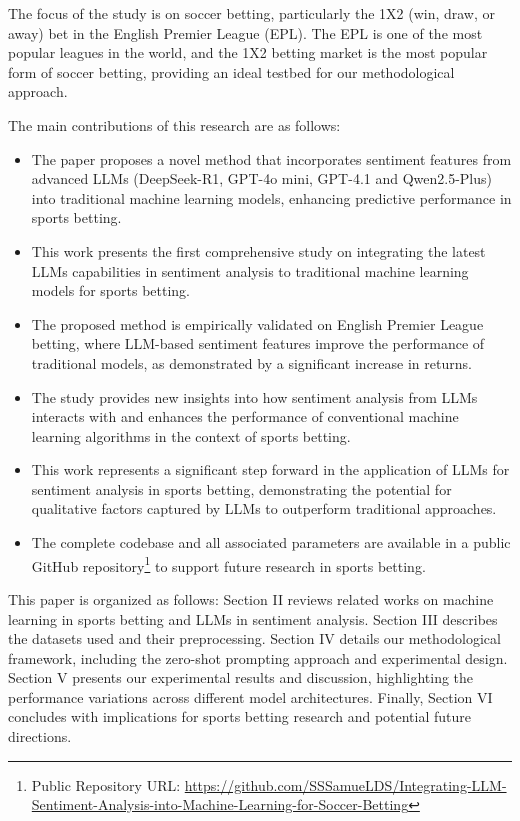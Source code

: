 \documentclass[conference]{IEEEtran}
\begin{document}
The focus of the study is on soccer betting, particularly the 1X2 (win, draw, or away) bet in the English Premier League (EPL). The EPL is one of the most popular leagues in the world, and the 1X2 betting market is the most popular form of soccer betting, providing an ideal testbed for our methodological approach.

The main contributions of this research are as follows:
\begin{itemize}
\item The paper proposes a novel method that incorporates sentiment features from advanced LLMs (DeepSeek-R1, GPT-4o mini, GPT-4.1 and Qwen2.5-Plus) into traditional machine learning models, enhancing predictive performance in sports betting.
\item This work presents
the first comprehensive study on integrating the latest LLMs
capabilities in sentiment analysis to traditional machine learning
models for sports betting.
\item  The proposed method is empirically validated on English Premier League betting, where LLM-based sentiment features improve the performance of traditional models, as demonstrated by a significant increase in returns.
\item The study provides new insights into how sentiment analysis from LLMs interacts with and enhances the performance of conventional machine learning algorithms in the context of sports betting.
\item This work represents a significant step forward in the application of LLMs for sentiment analysis in sports betting, demonstrating the potential for qualitative factors captured by LLMs to outperform traditional approaches.
\item The complete codebase and all associated parameters are available in a public GitHub repository\footnote{Public Repository URL: \url{https://github.com/SSSamueLDS/Integrating-LLM-Sentiment-Analysis-into-Machine-Learning-for-Soccer-Betting}} to support future research in sports betting.
\end{itemize}

This paper is organized as follows: Section II reviews related works on machine learning in sports betting and LLMs in sentiment analysis. Section III describes the datasets used and their preprocessing. Section IV details our methodological framework, including the zero-shot prompting approach and experimental design. Section V presents our experimental results and discussion, highlighting the performance variations across different model architectures. Finally, Section VI concludes with implications for sports betting research and potential future directions.
\end{document}

